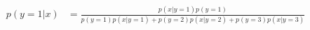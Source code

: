 \begin{align*}
	p(y = 1 | x) & = \frac{p(x | y = 1)p(y = 1)}{p(y = 1)p(x | y = 1) + p(y = 2)p(x | y=2) + p(y = 3)p(x | y = 3)}
\end{align*}